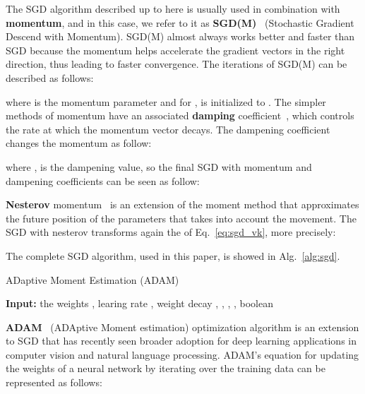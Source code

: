 \documentclass[10pt,twocolumn,letterpaper]{article}
\begin{document}
The SGD algorithm described up to here is usually used in combination with \textbf{momentum}, and in this case, we refer to it as \textbf{SGD(M)}~\cite{sutskever2013importance} (Stochastic Gradient Descend with Momentum).
SGD(M) almost always works better and faster than SGD because the momentum helps accelerate the gradient vectors in the right direction, thus leading to faster convergence.
The iterations of SGD(M) can be described as follows:


where  is the momentum parameter and for ,  is initialized to .
The simpler methods of momentum have an associated \textbf{damping} coefficient~\cite{damaskinos2018asynchronous}, which controls the rate at which the momentum vector decays.
The dampening coefficient changes the momentum as follow:

where , is the dampening value, so the final SGD with momentum and dampening coefficients can be seen as follow:

\textbf{Nesterov} momentum~\cite{liu2018accelerating} is an extension of the moment method that approximates the future position of the parameters that takes into account the movement.
The SGD with nesterov transforms again the  of Eq.~\ref{eq:sgd_vk}, more precisely: 

The complete SGD algorithm, used in this paper, is showed in Alg.~\ref{alg:sgd}.

\begin{algorithm} \scriptsize
\caption{ADaptive Moment Estimation (ADAM)}
\textbf{Input:} the weights , learing rate , weight decay , , , , boolean 
\begin{algorithmic}[1]
\State{}
\State{}
\State{}
\Function{}{, , , , , , , }
\State{}
    \State{}
    \State{}
    \If{}
\State{}
        \State{}
    \Else
        \State{}
    \EndIf
    \State{}
    \State{}
    \State{\Return{}}
\EndFunction

    \State{}
    \State{}
\EndFor

\end{algorithmic}
\label{alg:adam}
\end{algorithm}


\textbf{ADAM}~\cite{kingma2014adam} (ADAptive Moment estimation) optimization algorithm is an extension to SGD that has recently seen broader adoption for deep learning applications in computer vision and natural language processing.
ADAM's equation for updating the weights of a neural network by iterating over the training data can be represented as follows:
\end{document}
